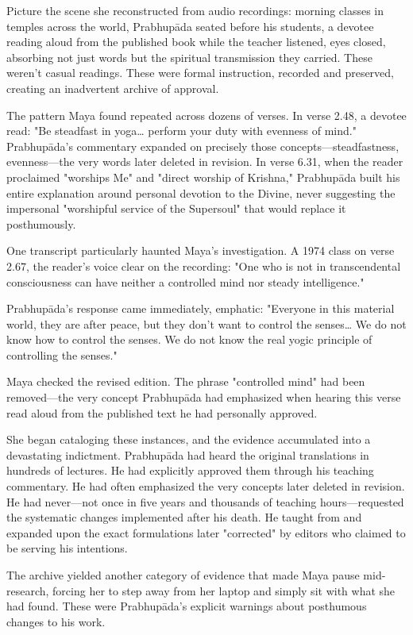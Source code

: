 \documentclass[12pt,twoside]{book}
\begin{document}
Picture the scene she reconstructed from audio recordings: morning classes in temples across the world, Prabhupāda seated before his students, a devotee reading aloud from the published book while the teacher listened, eyes closed, absorbing not just words but the spiritual transmission they carried. These weren't casual readings. These were formal instruction, recorded and preserved, creating an inadvertent archive of approval.

The pattern Maya found repeated across dozens of verses. In verse 2.48, a devotee read: "Be steadfast in yoga\ldots{} perform your duty with evenness of mind." Prabhupāda's commentary expanded on precisely those concepts—steadfastness, evenness—the very words later deleted in revision. In verse 6.31, when the reader proclaimed "worships Me" and "direct worship of Krishna," Prabhupāda built his entire explanation around personal devotion to the Divine, never suggesting the impersonal "worshipful service of the Supersoul" that would replace it posthumously.

One transcript particularly haunted Maya's investigation. A 1974 class on verse 2.67, the reader's voice clear on the recording: "One who is not in transcendental consciousness can have neither a controlled mind nor steady intelligence."

Prabhupāda's response came immediately, emphatic: "Everyone in this material world, they are after peace, but they don't want to control the senses\ldots{} We do not know how to control the senses. We do not know the real yogic principle of controlling the senses."

Maya checked the revised edition. The phrase "controlled mind" had been removed—the very concept Prabhupāda had emphasized when hearing this verse read aloud from the published text he had personally approved.

She began cataloging these instances, and the evidence accumulated into a devastating indictment. Prabhupāda had heard the original translations in hundreds of lectures. He had explicitly approved them through his teaching commentary. He had often emphasized the very concepts later deleted in revision. He had never—not once in five years and thousands of teaching hours—requested the systematic changes implemented after his death. He taught from and expanded upon the exact formulations later "corrected" by editors who claimed to be serving his intentions.

The archive yielded another category of evidence that made Maya pause mid-research, forcing her to step away from her laptop and simply sit with what she had found. These were Prabhupāda's explicit warnings about posthumous changes to his work.
\end{document}
